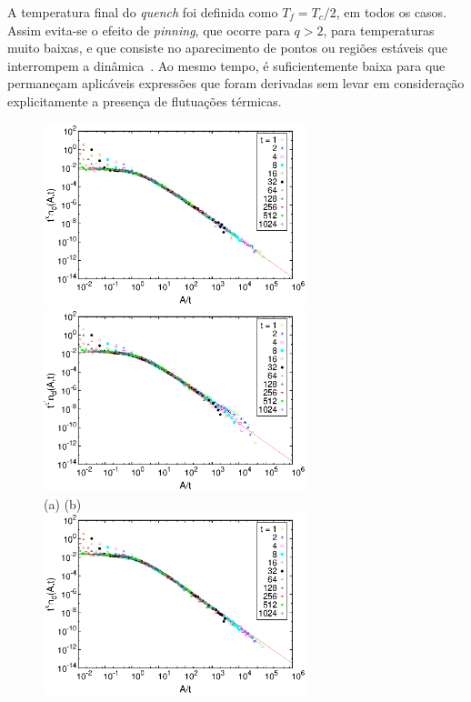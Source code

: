 A temperatura final do \textit{quench} foi definida como $T_f=T_c/2$, em todos os casos. Assim evita-se o efeito de \textit{pinning}, que ocorre para $q > 2$, para temperaturas muito baixas, e que consiste no aparecimento de pontos ou regiões estáveis que interrompem a dinâmica~\cite{DerridaOliveiraStauffer}. Ao mesmo tempo, é suficientemente baixa para que permaneçam aplicáveis expressões que foram derivadas sem levar em consideração explicitamente a presença de flutuações térmicas.

\begin{figure}
 \centering
 \includegraphics[width=7.65cm]{fig/areasnp_col_q2_L512_Tc_Tc2.eps}
 \includegraphics[width=7.65cm]{fig/areasnp_col_q2_L512_Tinf_Tc2.eps} \\
\hspace{8mm} (a) \hspace{70mm} (b)  \\
 \includegraphics[width=7.65cm]{fig/areasnp_col_q3_L512_Tc_Tc2.eps}

\end{figure}
